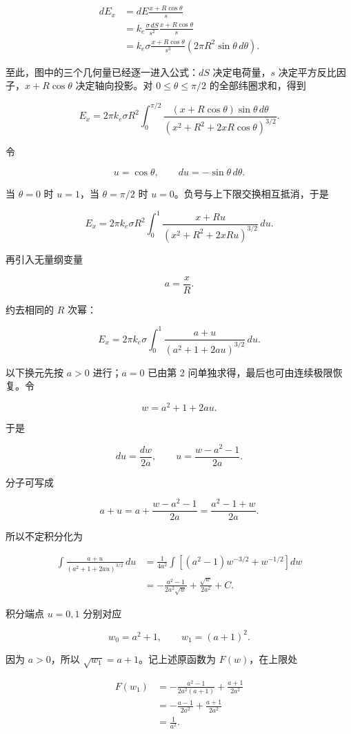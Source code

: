 \documentclass[12pt,a4paper,UTF8]{ctexart}
\begin{document}
\[
\begin{aligned}
dE_x
&=dE\frac{x+R\cos\theta}{s}\\
&=k_e\frac{\sigma\,dS}{s^2}
\frac{x+R\cos\theta}{s}\\
&=k_e\sigma\frac{x+R\cos\theta}{s^3}
\left(2\pi R^2\sin\theta\,d\theta\right).
\end{aligned}
\]

至此，图中的三个几何量已经逐一进入公式：\(dS\) 决定电荷量，\(s\)
决定平方反比因子，\(x+R\cos\theta\) 决定轴向投影。对
\(0\le\theta\le\pi/2\) 的全部纬圈求和，得到

\[
E_x=2\pi k_e\sigma R^2
\int_0^{\pi/2}
\frac{(x+R\cos\theta)\sin\theta\,d\theta}
{(x^2+R^2+2xR\cos\theta)^{3/2}}.
\]

令

\[
u=\cos\theta,
\qquad
du=-\sin\theta\,d\theta.
\]

当 \(\theta=0\) 时 \(u=1\)，当 \(\theta=\pi/2\) 时
\(u=0\)。负号与上下限交换相互抵消，于是

\[
E_x=2\pi k_e\sigma R^2
\int_0^1
\frac{x+Ru}{(x^2+R^2+2xRu)^{3/2}}\,du.
\]

再引入无量纲变量

\[
a=\frac{x}{R}.
\]

约去相同的 \(R\) 次幂：

\[
E_x=2\pi k_e\sigma
\int_0^1
\frac{a+u}{(a^2+1+2au)^{3/2}}\,du.
\]

以下换元先按 \(a>0\) 进行；\(a=0\) 已由第 2
问单独求得，最后也可由连续极限恢复。令

\[
w=a^2+1+2au.
\]

于是

\[
du=\frac{dw}{2a},
\qquad
u=\frac{w-a^2-1}{2a}.
\]

分子可写成

\[
a+u
=a+\frac{w-a^2-1}{2a}
=\frac{a^2-1+w}{2a}.
\]

所以不定积分化为

\[
\begin{aligned}
\int\frac{a+u}{(a^2+1+2au)^{3/2}}\,du
&=\frac{1}{4a^2}\int
\left[(a^2-1)w^{-3/2}+w^{-1/2}\right]dw\\
&=-\frac{a^2-1}{2a^2\sqrt w}
+\frac{\sqrt w}{2a^2}+C.
\end{aligned}
\]

积分端点 \(u=0,1\) 分别对应

\[
w_0=a^2+1,
\qquad
w_1=(a+1)^2.
\]

因为 \(a>0\)，所以 \(\sqrt{w_1}=a+1\)。记上述原函数为 \(F(w)\)，在上限处

\[
\begin{aligned}
F(w_1)
&=-\frac{a^2-1}{2a^2(a+1)}
+\frac{a+1}{2a^2}\\
&=-\frac{a-1}{2a^2}+\frac{a+1}{2a^2}\\
&=\frac{1}{a^2}.
\end{aligned}
\]
\end{document}
